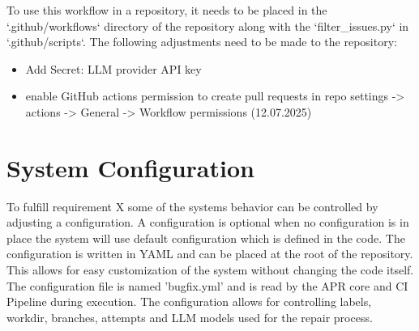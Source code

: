 To use this workflow in a repository, it needs to be placed in the `.github/workflows` directory of the repository along with the `filter\_issues.py` in `.github/scripts`.
The following adjustments need to be made to the repository:
\begin{itemize}
    \item Add Secret: LLM provider API key
    \item enable GitHub actions permission to create pull requests in repo settings -> actions -> General -> Workflow permissions (12.07.2025)
\end{itemize}


\section{System Configuration}

To fulfill requirement X some of the systems behavior can be controlled by adjusting a configuration. A configuration is optional when no configuration is in place the system will use default configuration which is defined in the code. The configuration is written in YAML and can be placed at the root of the repository. This allows for easy customization of the system without changing the code itself. The configuration file is named 'bugfix.yml' and is read by the APR core and CI Pipeline during execution. The configuration allows for controlling labels, workdir, branches, attempts and LLM models used for the repair process.

